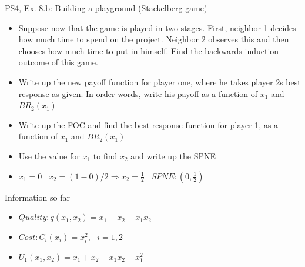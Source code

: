 \begin{frame}{PS4, Ex. 8.b: Building a playground (Stackelberg game)}
    \begin{itemize}
    \item[(b)] Suppose now that the game is played in two stages. First, neighbor 1 decides how much time to spend on the project. Neighbor 2 observes this and then chooses how much time to put in himself. Find the backwards induction outcome of this game.
    \end{itemize}
    \vfill\null
  \begin{multicols}{2}
    \begin{itemize}
      \item[(Step 1)] Write up the new payoff function for player one, where he takes player 2s best response as given. In order words, write his payoff as a function of \begin{math}x_1\end{math} and \begin{math}BR_2(x_1)\end{math}
      \item[(Step 2)] Write up the FOC and find the best response function for player 1, as a function of \begin{math}x_1\end{math} and \begin{math}BR_2(x_1)\end{math}
      \item[(Step 3)] Use the value for $x_1$ to find $x_2$ and write up the SPNE 
      \item[(SPNE)]\begin{math} x_1=0 \end{math} \
      \begin{math} x_2=(1-0)/2 \Rightarrow x_2=\frac{1}{2}\end{math} \ \begin{math}SPNE: (0,\frac{1}{2})\end{math}
    \end{itemize}
    \vfill\null \columnbreak
    Information so far
    \begin{itemize}
      \item[1] \begin{math}Quality: q(x_1,x_2)=x_1+x_2-x_1x_2 \end{math}
      \item[2] \begin{math}Cost: C_i(x_i)=x_i^2,\ \ \ i=1,2  \end{math}
      \item[3] \begin{math}U_1(x_1,x_2)=x_1+x_2-x_1x_2-x_1^2 \end{math}

\end{itemize}
\end{multicols}
\end{frame}
